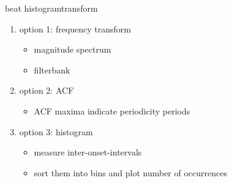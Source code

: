             \begin{frame}{beat histogram}{transform}
                    \begin{enumerate}
                        \item<1->   option 1: frequency transform
                            \begin{itemize}
                                \item   magnitude spectrum
                                \item   filterbank
                            \end{itemize}
                        \bigskip
                        \item<1->   option 2: ACF
                            \begin{itemize}
                                \item   ACF maxima indicate periodicity periods
                            \end{itemize}
                        \bigskip
                        \item<1->   option 3: histogram
                            \begin{itemize}
                                \item   measure inter-onset-intervals
                                \item   sort them into bins and plot number of occurrences
                            \end{itemize}
                    \end{enumerate}
            \end{frame}
            

